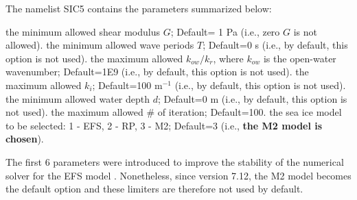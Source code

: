 The namelist {\F SIC5} contains the parameters summarized below:
\begin{clist}
 {the minimum allowed shear modulus $G$; Default= 1 Pa (i.e., zero $G$ is not allowed).}
%
 {the minimum allowed wave periods $T$; Default=0 s (i.e., by default, this option is not used).}
%
 {the maximum allowed $k_{ow}/k_r$, where $k_{ow}$ is the open-water wavenumber; Default=1E9 (i.e., by default, this option is not used).}
%
 {the maximum allowed $k_i$; Default=100 m$^{-1}$ (i.e., by default, this option is not used).}
%
 {the minimum allowed water depth $d$; Default=0 m (i.e., by default, this option is not used).}
%
 {the maximum allowed \# of iteration; Default=100.}
%
 {the sea ice model to be selected: 1 - {\code EFS}, 2 - RP, 3 - M2; Default=3 (i.e., \textbf{the M2 model is chosen}).}
\end{clist}
The first 6 parameters were introduced to improve the stability of the numerical solver for the EFS model \citep[the solver may fail for small wave periods in some rare cases, particularly for shallow water depth $d$ and low $G$; see][]{Liu2020}. Nonetheless, since version 7.12, the M2 model becomes the default option and these limiters are therefore not used by default.